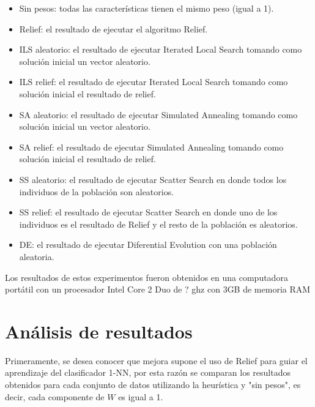 \documentclass{ci5652}
\begin{document}
\begin{itemize}
  \item Sin pesos: todas las características tienen el mismo peso (igual a 1).
  \item Relief: el resultado de ejecutar el algoritmo Relief.
  \item ILS aleatorio: el resultado de ejecutar Iterated Local Search tomando 
  como solución inicial un vector aleatorio.
  \item ILS relief: el resultado de ejecutar Iterated Local Search tomando como
  solución inicial el resultado de relief.
  \item SA aleatorio: el resultado de ejecutar Simulated Annealing tomando como
  solución inicial un vector aleatorio.
  \item SA relief: el resultado de ejecutar Simulated Annealing tomando como
  solución inicial el resultado de relief.
  \item SS aleatorio: el resultado de ejecutar Scatter Search en donde todos los
  individuos de la población son aleatorios.
  \item SS relief: el resultado de ejecutar Scatter Search en donde uno de los
  individuos es el resultado de Relief y el resto de la población es aleatorios.
  \item DE: el resultado de ejecutar Diferential Evolution con una población
  aleatoria.
\end{itemize}

Los resultados de estos experimentos fueron obtenidos en una computadora portátil con un procesador Intel Core 2 Duo de ? ghz con 3GB de memoria RAM


\section{Análisis de resultados}

Primeramente, se desea conocer que mejora supone el uso de Relief para guiar el aprendizaje del clasificador 1-NN, por esta razón se comparan los resultados obtenidos para cada conjunto de datos utilizando la heurística y "sin pesos", es decir, cada componente de $W$ es igual a 1.\\
\end{document}
